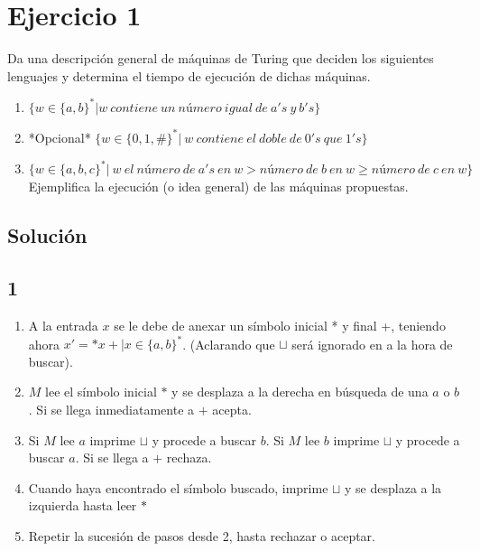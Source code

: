 \section{Ejercicio 1}


\begin{tcolorbox}[enunciado]
Da una descripción general de máquinas de Turing que deciden los siguientes lenguajes y determina el tiempo de ejecución de dichas máquinas.
\begin{enumerate}
    \item $ \{ w \in  \{a,b\}^* | w  \ contiene \ un \ número \ igual \ de \ a's \ y \ b's  \} $
    \item  *Opcional* $\{w \in \{ 0,1,\#\}^{*} | \ w \ contiene \ el \ doble \ de \ 0's \ que \ 1's \}$
    \item $\{ w \in \{ a,b,c\}^*|\ w \ el \ número \ de \ a's\ en \ w>número \ de \ b \ en \ w \geq número \ de \ c \ en \ w  \}$
Ejemplifica la ejecución (o idea general) de las máquinas propuestas. 
\end{enumerate}
\end{tcolorbox}

\subsection{Solución}
\subsection{1}
\begin{enumerate}
    \item A la entrada $x$ se le debe de anexar un símbolo inicial * y final +, teniendo ahora $x'=*x+ |x\in\{a,b\}^*$. (Aclarando que $\sqcup$ será ignorado en a la hora de buscar).
    \item $M$ lee el símbolo inicial $*$ y se desplaza a la derecha en búsqueda de una $a$ o $b$. Si se llega inmediatamente a $+$ acepta.
    \item Si $M$ lee $a$ imprime $\sqcup$ y procede a buscar $b$. Si $M$ lee $b$ imprime $\sqcup$ y procede a buscar $a$. Si se llega a $+$ rechaza.
    \item Cuando haya encontrado el símbolo buscado, imprime $\sqcup$ y se desplaza a la izquierda hasta leer $*$
    \item Repetir la sucesión de pasos desde 2, hasta rechazar o aceptar.
\end{enumerate}
